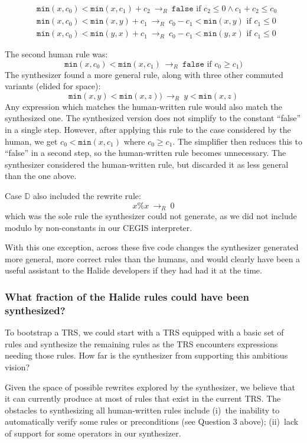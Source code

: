 \documentclass[acmsmall,review,anonymous]{acmart}\settopmatter{printfolios=true,printccs=false,printacmref=false}
\newcommand{\hmin}[0]{\texttt{min}}
\newcommand{\rewrites}[0]{\:\rightarrow_{R}\:}
\newcommand{\pred}[0]{\textrm{ if }}
\newcommand{\hfalse}[0]{\texttt{false}}
\begin{document}
\begin{align*}
& \hmin(x, c_0) < \hmin(x, c_1) + c_2 \rewrites  \hfalse \pred c_2 \leq 0 \wedge c_1 + c_2 \leq c_0 \\
& \hmin(x, c_0) < \hmin(x, y) + c_1 \rewrites c_0 - c_1 < \hmin(x, y) \pred c_1 \leq 0 \\
& \hmin(x, c_0) < \hmin(y, x) + c_1 \rewrites c_0 - c_1 < \hmin(y, x) \pred c_1 \leq 0
\end{align*}

The second human rule was:
\[
\hmin(x, c_0) < \hmin(x, c_1) \rewrites \hfalse \pred c_0 \geq c_1) 
\]
The synthesizer found a more general rule, along with three other commuted variants (elided for space):
\[
\hmin(x, y) < \hmin(x, z)) \rewrites y < \hmin(x, z)
\]
Any expression which matches the human-written rule would also match the synthesized one. The synthesized version does not simplify to the constant “false” in a single step. However, after applying this rule to the case considered by the human, we get $c_0 < \hmin(x, c_1)$ where $c_0 \geq c_1$. The simplifier then reduces this to “false” in a second step, so the human-written rule becomes unnecessary. The synthesizer considered the human-written rule, but discarded it as less general than the one above.

Case $\mathbb{D}$ also included the rewrite rule: 
\[
x \% x \rewrites 0
\]
which was the sole rule the synthesizer could not generate, as we did not include modulo by non-constants in our CEGIS interpreter.

With this one exception, across these five code changes the synthesizer generated more general, more correct rules than the humans, and would clearly have been a useful assistant to the Halide developers if they had had it at the time.


\subsubsection{What fraction of the Halide rules could have been synthesized?}

To bootstrap a TRS, we could start with a TRS equipped with a basic set of rules and synthesize the remaining rules as the TRS encounters expressions needing those rules.  How far is the synthesizer from supporting this ambitious vision?

Given the space of possible rewrites explored by the synthesizer, we believe that it can currently produce at most \PercentPossibleToSynth{} of rules that exist in the current TRS. The obstacles to synthesizing all human-written rules include (i)~the inability to automatically verify some rules or preconditions (see Question 3 above); (ii)~lack of support for some operators in our synthesizer. 
\end{document}
